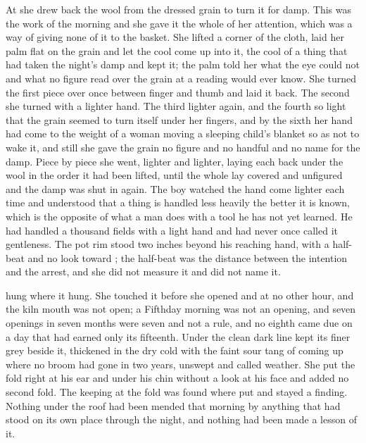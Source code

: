At  she drew back the wool from the dressed grain to turn it for damp. This was the work of the morning and she gave it the whole of her attention, which was a way of giving none of it to the basket. She lifted a corner of the cloth, laid her palm flat on the grain and let the cool come up into it, the cool of a thing that had taken the night's damp and kept it; the palm told her what the eye could not and what no figure read over the grain at a reading would ever know. She turned the first piece over once between finger and thumb and laid it back. The second she turned with a lighter hand. The third lighter again, and the fourth so light that the grain seemed to turn itself under her fingers, and by the sixth her hand had come to the weight of a woman moving a sleeping child's blanket so as not to wake it, and still she gave the grain no figure and no handful and no name for the damp. Piece by piece she went, lighter and lighter, laying each back under the wool in the order it had been lifted, until the whole lay covered and unfigured and the damp was shut in again. The boy watched the hand come lighter each time and understood that a thing is handled less heavily the better it is known, which is the opposite of what a man does with a tool he has not yet learned. He had handled a thousand fields with a light hand and had never once called it gentleness. The pot rim stood two inches beyond his reaching hand, with a half-beat and no look toward ; the half-beat was the distance between the intention and the arrest, and she did not measure it and did not name it.

 hung where it hung. She touched it before she opened  and at no other hour, and the kiln mouth was not open; a Fifthday morning was not an opening, and seven openings in seven months were seven and not a rule, and no eighth came due on a day that had earned only its fifteenth. Under  the clean dark line kept its finer grey beside it, thickened in the dry cold with the faint sour tang of  coming up where no broom had gone in two years, unswept and called weather. She put the fold right at his ear and under his chin without a look at his face and added no second fold. The keeping at the fold was found where put and stayed a finding. Nothing under the roof had been mended that morning by anything that had stood on its own place through the night, and nothing had been made a lesson of it.

\scenebreak

